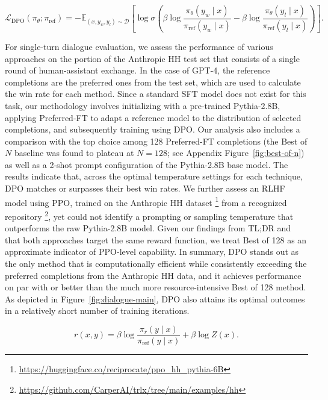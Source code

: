 \begin{equation}\label{eq:optimum_model}
    \mathcal{L}_\text{DPO}(\pi_{\theta}; \pi_\text{ref}) = -\mathbb{E}_{(x, y_w, y_l)\sim \mathcal{D}}\left[\log \sigma \left(\beta \log \frac{\pi_{\theta}(y_w\mid x)}{\pi_\text{ref}(y_w\mid x)} - \beta \log \frac{\pi_{\theta}(y_l\mid x)}{\pi_\text{ref}(y_l\mid x)}\right)\right].
\end{equation}

For single-turn dialogue evaluation, we assess the performance of various approaches on the portion of the Anthropic HH test set \citep{bai2022training} that consists of a single round of human-assistant exchange. In the case of GPT-4, the reference completions are the preferred ones from the test set, which are used to calculate the win rate for each method. Since a standard SFT model does not exist for this task, our methodology involves initializing with a pre-trained Pythia-2.8B, applying Preferred-FT to adapt a reference model to the distribution of selected completions, and subsequently training using DPO. Our analysis also includes a comparison with the top choice among 128 Preferred-FT completions (the Best of $N$ baseline was found to plateau at $N=128$; see Appendix Figure~\ref{fig:best-of-n}) as well as a 2-shot prompt configuration of the Pythia-2.8B base model. The results indicate that, across the optimal temperature settings for each technique, DPO matches or surpasses their best win rates. We further assess an RLHF model using PPO, trained on the Anthropic HH dataset \footnote{\url{https://huggingface.co/reciprocate/ppo_hh_pythia-6B}} from a recognized repository \footnote{\url{https://github.com/CarperAI/trlx/tree/main/examples/hh}}, yet could not identify a prompting or sampling temperature that outperforms the raw Pythia-2.8B model. Given our findings from TL;DR and that both approaches target the same reward function, we treat Best of 128 as an approximate indicator of PPO-level capability. In summary, DPO stands out as the only method that is computationally efficient while consistently exceeding the preferred completions from the Anthropic HH data, and it achieves performance on par with or better than the much more resource-intensive Best of 128 method. As depicted in Figure~\ref{fig:dialogue-main}, DPO also attains its optimal outcomes in a relatively short number of training iterations.

\begin{equation}\label{eq:main_eq}
    r(x,y) =\beta \log \frac{\pi_r(y\mid x)}{\pi_\text{ref}(y\mid x)} + \beta \log Z(x).
\end{equation}

